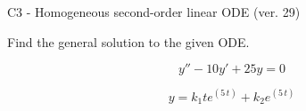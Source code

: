 \begin{exercise}
  \begin{exerciseTitle}C3 - Homogeneous second-order linear ODE (ver. 29)\end{exerciseTitle}
  \begin{exerciseStatement}
    
Find the general solution to the given ODE.

    
\[y''-10y'+25y = 0\]

  \end{exerciseStatement}
  \begin{exerciseAnswer}
    
\[y= k_{1} t e^{\left(5 \, t\right)} + k_{2} e^{\left(5 \, t\right)}\]

  \end{exerciseAnswer}
\end{exercise}